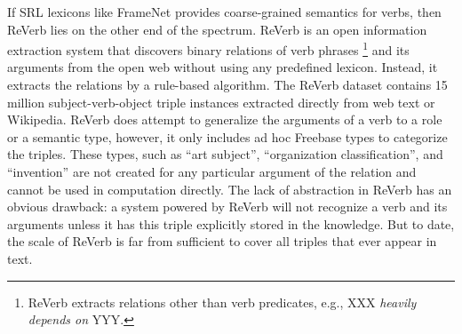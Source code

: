 If SRL lexicons like FrameNet provides coarse-grained semantics for
verbs, then ReVerb \cite{FaderSE11} lies on the other end of the spectrum.
ReVerb is an open information extraction system that discovers
binary relations of verb phrases \footnote{ReVerb extracts relations
other than verb predicates, e.g., XXX {\em heavily depends on} YYY.}
and its arguments from the open web without
using any predefined lexicon. Instead, it extracts the relations by
a rule-based algorithm. The ReVerb dataset contains
15 million subject-verb-object triple instances extracted directly from
web text or Wikipedia.
ReVerb does attempt to generalize the arguments of a verb
to a role or a semantic type, however, it only includes ad hoc
Freebase \cite{freebase}
types to categorize the triples. These types, such as
``art subject'', ``organization classification'', and ``invention''
are not created for any particular argument of the relation and cannot be
used in computation directly.  The lack of abstraction in ReVerb has
an obvious drawback: a system powered by ReVerb will not recognize a
verb and its arguments unless it has this triple explicitly stored
in the knowledge. But to date, the scale of ReVerb is far from sufficient
to cover all triples that ever appear in text.

%
%

